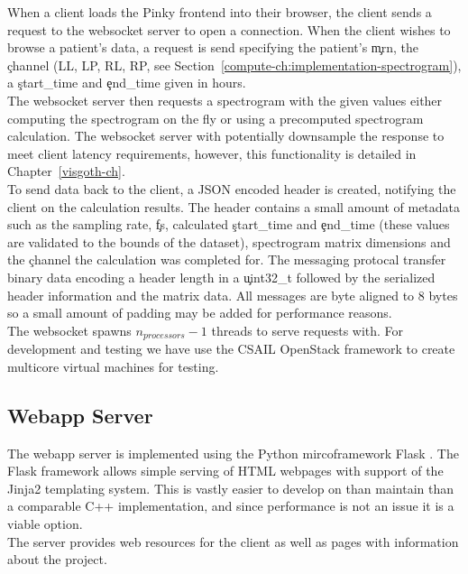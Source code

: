 When a client loads the Pinky frontend into their browser, the client sends a
request to the websocket server to open a connection. When the client wishes to
browse a patient's data, a request is send specifying the patient's \c{mrn},
the \c{channel} (LL, LP, RL, RP, see
Section~\ref{compute-ch:implementation-spectrogram}), a \c{start\_time} and
\c{end\_time} given in hours. \\

The websocket server then requests a spectrogram with the given values either
computing the spectrogram on the fly or using a precomputed spectrogram
calculation. The websocket server with potentially downsample the response to
meet client latency requirements, however, this functionality is detailed in
Chapter~\ref{visgoth-ch}. \\

To send data back to the client, a JSON encoded header is created, notifying
the client on the calculation results. The header contains a small amount of
metadata such as the sampling rate, \c{fs}, calculated \c{start\_time} and
\c{end\_time} (these values are validated to the bounds of the dataset),
spectrogram matrix dimensions and the \c{channel} the calculation was completed
for. The messaging protocal transfer binary data encoding a header length in a
\c{uint32\_t} followed by the serialized header information and the matrix data.
All messages are byte aligned to 8 bytes so a small amount of padding may be
added for performance reasons. \\

The websocket spawns $n_{processors} - 1$ threads to serve requests with. For
development and testing we have use the CSAIL OpenStack framework to create
multicore virtual machines for testing.

\subsection{Webapp Server}\label{compute-ch:implementation-webapp}

The webapp server is implemented using the Python mircoframework Flask
\cite{flask}. The Flask framework allows simple serving of HTML webpages with
support of the Jinja2 \cite{jinja2} templating system. This is vastly easier to
develop on than maintain than a comparable C++ implementation, and since
performance is not an issue it is a viable option. \\

The server provides web resources for the client as well as pages with
information about the project.

